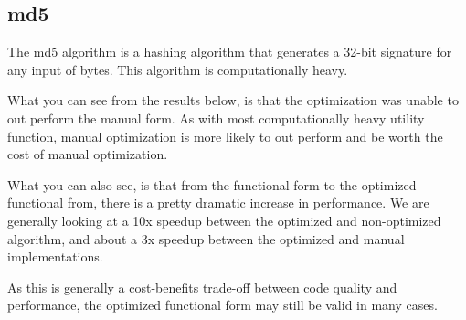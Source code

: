 \subsection{md5}
The md5 algorithm is a hashing algorithm that generates a 32-bit signature for any input of bytes. This algorithm is computationally heavy.

What you can see from the results below, is that the optimization was unable to out perform the manual form.  As with most computationally heavy utility function, manual optimization is more likely to out perform and be worth the cost of manual optimization.  

What you can also see, is that from the functional form to the optimized functional from, there is a pretty dramatic increase in performance.  We are generally looking at a 10x speedup between the optimized and non-optimized algorithm, and about a 3x speedup between the optimized and manual implementations.  

As this is generally a cost-benefits trade-off between code quality and performance, the optimized functional form may still be valid in many cases.